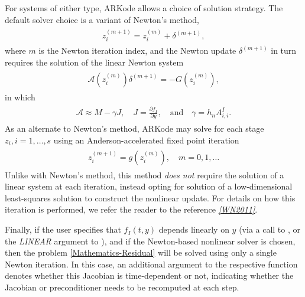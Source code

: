 \documentclass[letterpaper,10pt,english]{sphinxmanual}
\begin{document}
For systems of either type, ARKode allows a choice of solution
strategy. The default solver choice is a variant of Newton's
method,
\label{Mathematics:equation-Newton_iteration}\begin{gather}
\begin{split}z_i^{(m+1)} = z_i^{(m)} + \delta^{(m+1)},\end{split}\label{Mathematics-Newton_iteration}
\end{gather}
where \(m\) is the Newton iteration index, and the Newton
update \(\delta^{(m+1)}\) in turn requires the solution of the
linear Newton system
\label{Mathematics:equation-Newton_system}\begin{gather}
\begin{split}{\mathcal A}\left(z_i^{(m)}\right) \delta^{(m+1)} = -G\left(z_i^{(m)}\right),\end{split}\label{Mathematics-Newton_system}
\end{gather}
in which
\label{Mathematics:equation-NewtonMatrix}\begin{gather}
\begin{split}{\mathcal A} \approx M - \gamma J, \quad J = \frac{\partial f_I}{\partial y},
\quad\text{and}\quad \gamma = h_n A^I_{i,i}.\end{split}\label{Mathematics-NewtonMatrix}
\end{gather}
As an alternate to Newton's method, ARKode may solve for each stage
\(z_i, i=1,\ldots,s\) using an Anderson-accelerated fixed
point iteration
\label{Mathematics:equation-AAFP_iteration}\begin{gather}
\begin{split}z_i^{(m+1)} = g(z_i^{(m)}), \quad m=0,1,\ldots\end{split}\label{Mathematics-AAFP_iteration}
\end{gather}
Unlike with Newton's method, this method \emph{does not} require the
solution of a linear system at each iteration, instead opting for
solution of a low-dimensional least-squares solution to construct the
nonlinear update.  For details on how this iteration is performed, we
refer the reader to the reference \label{Mathematics:id2}{\hyperref[References:wn2011]{\emph{{[}WN2011{]}}}}.

Finally, if the user specifies that \(f_I(t,y)\) depends linearly
on \(y\) (via a call to {\hyperref[c_interface/User_callable:c.ARKodeSetLinear]{\emph{}}}, or the
\emph{LINEAR} argument to {\hyperref[f_interface/Usage:f/_/FARKSETIIN]{\emph{}}}), and if the
Newton-based nonlinear solver is chosen, then the problem
\eqref{Mathematics-Residual} will be solved using only a single Newton iteration.
In this case, an additional argument to the respective function
denotes whether this Jacobian is time-dependent or not, indicating
whether the Jacobian or preconditioner needs to be recomputed at each
step.
\end{document}
